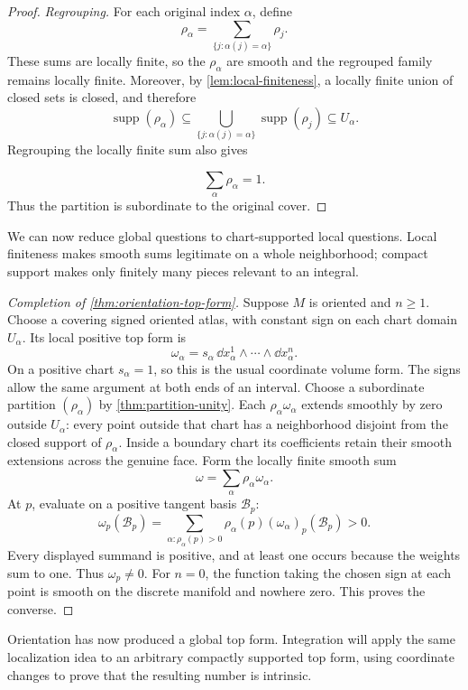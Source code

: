 \begin{proof}
\emph{Regrouping.} For each original index \(\alpha\), define
\[
\rho_\alpha=\sum_{\{j:\alpha(j)=\alpha\}}\rho_j.
\]
These sums are locally finite, so the \(\rho_\alpha\) are smooth and the
regrouped family remains locally finite.  Moreover, by \cref{lem:local-finiteness}, a locally finite union of
closed sets is closed, and therefore
\[
\operatorname{supp}(\rho_\alpha)
\subseteq\bigcup_{\{j:\alpha(j)=\alpha\}}\operatorname{supp}(\rho_j)
\subseteq U_\alpha.
\]
Regrouping the locally finite sum also gives

\[
\sum_\alpha\rho_\alpha=1.
\]
  Thus the partition is subordinate to the
original cover.
\end{proof}

We can now reduce global questions to chart-supported local questions.
Local finiteness makes smooth sums legitimate on a whole neighborhood;
compact support makes only finitely many pieces relevant to an integral.

\begin{proof}[Completion of \cref{thm:orientation-top-form}]
Suppose $M$ is oriented and $n\geq1$. Choose a covering signed oriented
atlas, with constant sign on each chart domain $U_\alpha$. Its local
positive top form is
\[
\omega_\alpha=s_\alpha\,\dd x_\alpha^1\wedge\cdots\wedge\dd x_\alpha^n.
\]
On a positive chart $s_\alpha=1$, so this is the usual coordinate volume
form. The signs allow the same argument at both ends of an interval.
Choose a subordinate partition $(\rho_\alpha)$ by
\cref{thm:partition-unity}. Each $\rho_\alpha\omega_\alpha$ extends
smoothly by zero outside $U_\alpha$: every point outside that chart has
a neighborhood disjoint from the closed support of $\rho_\alpha$.
Inside a boundary chart its coefficients retain their smooth extensions
across the genuine face. Form the locally finite smooth sum
\[
\omega=\sum_\alpha\rho_\alpha\omega_\alpha.
\]
At $p$, evaluate on a positive tangent basis $\mathcal B_p$:
\[
\omega_p(\mathcal B_p)
=\sum_{\alpha:\rho_\alpha(p)>0}
\rho_\alpha(p)(\omega_\alpha)_p(\mathcal B_p)>0.
\]
Every displayed summand is positive, and at least one occurs because
the weights sum to one. Thus $\omega_p\ne0$.
For $n=0$, the function taking the chosen sign at each point is smooth
on the discrete manifold and nowhere zero. This proves the converse.
\end{proof}
Orientation has now produced a global top form. Integration will apply
the same localization idea to an arbitrary compactly supported top form,
using coordinate changes to prove that the resulting number is intrinsic.

